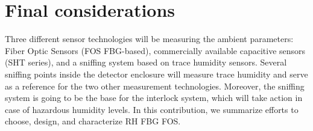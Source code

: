 \newpage
\section{Final considerations}
Three different sensor technologies will be measuring the ambient parameters: Fiber Optic Sensors (FOS FBG-based), commercially available capacitive sensors (SHT series), and a sniffing system based on trace humidity sensors.
Several sniffing points inside the detector enclosure will measure trace humidity and serve as a  reference for the two other measurement technologies. Moreover, the sniffing system is going to be the base for the interlock system, which will take action in case of hazardous humidity levels. In this contribution, we summarize efforts to choose, design, and characterize RH FBG FOS.